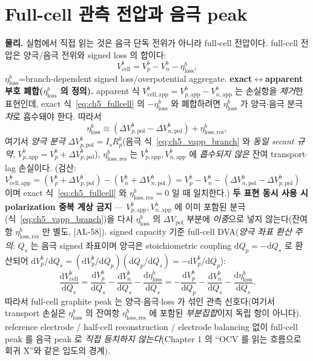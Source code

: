 \documentclass[11pt,a4paper]{article}
\newcommand{\dd}{\mathrm{d}}
\newcommand{\app}{\mathrm{app}}
\newcommand{\cell}{\mathrm{cell}}
\newcommand{\pol}{\mathrm{pol}}
\newcommand{\loss}{\mathrm{loss}}
\newcommand{\AL}[1]{\textsf{[AL-#1]}}
\begin{document}
\section{Full-cell 관측 전압과 음극 peak}\label{sec:ch5_fullcell}
\textbf{물리.} 실험에서 직접 읽는 것은 음극 단독 전위가 아니라 full-cell 전압이다. full-cell 전압은 양극/음극
전위와 signed loss 의 합이다:
\begin{equation}
V_\cell^b=V_p^b-V_n^b-\eta_\loss^b,
\label{eq:ch5_fullcell}
\end{equation}
$\eta_\loss^b$=branch-dependent signed loss/overpotential aggregate. \textbf{exact$\leftrightarrow$apparent 부호
폐합($\eta_\loss^b$ 의 정의).} apparent 식 $V_{\cell,\app}^b=V_{p,\app}^b-V_{n,\app}^b$ 는 손실항을 \emph{제거}한
표현인데, exact 식~\eqref{eq:ch5_fullcell} 의 $-\eta_\loss^b$ 와 폐합하려면 $\eta_\loss^b$ 가 양극$\cdot$음극
분극 \emph{차}로 흡수돼야 한다. 따라서
\begin{equation}
\eta_\loss^b\equiv(\Delta V_{p,\pol}^b-\Delta V_{n,\pol}^b)+\eta_{\loss,\mathrm{res}}^b,
\label{eq:ch5_etaloss_def}
\end{equation}
여기서 \emph{양극 분극} $\Delta V_{p,\pol}^b=I_s R_p^b$(음극 식~\eqref{eq:ch5_vapp_branch} 와 \emph{동일 secant
규약}, $V_{p,\app}^b=V_p^b+\Delta V_{p,\pol}^b$), $\eta_{\loss,\mathrm{res}}^b$ 는 $V_{p,\app}^b,V_{n,\app}^b$ 에
\emph{흡수되지 않은} 잔여 transport$\cdot$lag 손실이다. (검산: $V_{\cell,\app}^b=(V_p^b+\Delta V_{p,\pol}^b)
-(V_n^b+\Delta V_{n,\pol}^b)=V_p^b-V_n^b-(\Delta V_{n,\pol}^b-\Delta V_{p,\pol}^b)$ 이며 exact 식~\eqref{eq:ch5_fullcell}
와 $\eta_{\loss,\mathrm{res}}^b=0$ 일 때 일치한다.) \textbf{두 표현 동시 사용 시 polarization 중복 계상 금지} —
$V_{p,\app}^b,V_{n,\app}^b$ 에 이미 포함된 분극(식~\eqref{eq:ch5_vapp_branch})을 다시 $\eta_\loss^b$ 의 $\Delta V_\pol$
부분에 \emph{이중}으로 넣지 않는다(잔여항 $\eta_{\loss,\mathrm{res}}^b$ 만 별도, \AL{58}). signed capacity 기준
full-cell DVA(\emph{양극 좌표 환산 주의}: $Q_s$ 는 음극 signed 좌표이며 양극은 stoichiometric coupling $\dd Q_p=
-\dd Q_s$ 로 환산되어 $\dd V_p^b/\dd Q_s=(\dd V_p^b/\dd Q_p)(\dd Q_p/\dd Q_s)=-\dd V_p^b/\dd Q_p$):
\begin{equation}
\frac{\dd V_\cell^b}{\dd Q_s}=\frac{\dd V_p^b}{\dd Q_s}-\frac{\dd V_n^b}{\dd Q_s}-\frac{\dd\eta_\loss^b}{\dd Q_s}
=-\frac{\dd V_p^b}{\dd Q_p}-\frac{\dd V_n^b}{\dd Q_s}-\frac{\dd\eta_\loss^b}{\dd Q_s}.
\label{eq:ch5_fullcell_dva}
\end{equation}
따라서 full-cell graphite peak 는 양극$\cdot$음극$\cdot$loss 가 섞인 관측 신호다(여기서 transport 손실은
$\eta_\loss^b$ 의 잔여항 $\eta_{\loss,\mathrm{res}}^b$ 에 포함된 \emph{부분집합}이지 독립 항이 아니다). reference
electrode / half-cell reconstruction / electrode balancing 없이 full-cell peak 를 음극 peak 로 \emph{직접
등치하지 않는다}(Chapter 1 의 ``OCV 를 읽는 흐름으로 회귀 X''와 같은 입도의 경계).
\end{document}
